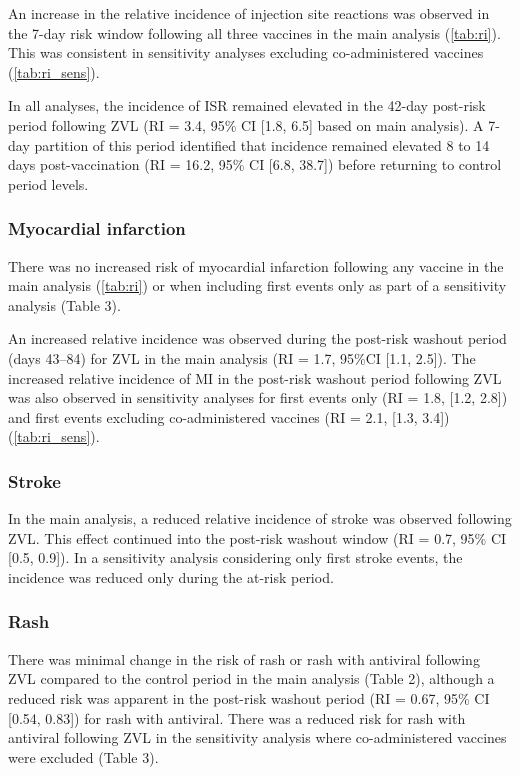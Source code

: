 \documentclass[review, endfloat]{elsarticle}
\begin{document}
An increase in the relative incidence of injection site reactions was observed in the 7-day risk window following all three vaccines in the main analysis (\autoref{tab:ri}). This was consistent in sensitivity analyses excluding co-administered vaccines (\autoref{tab:ri_sens}).

In all analyses, the incidence of ISR remained elevated in the 42-day post-risk period following ZVL (RI = 3.4, 95\% CI [1.8, 6.5] based on main analysis). A 7-day partition of this period identified that incidence remained elevated 8 to 14 days post-vaccination (RI = 16.2, 95\% CI [6.8, 38.7]) before returning to control period levels.

\subsubsection{Myocardial infarction}

There was no increased risk of myocardial infarction following any vaccine in the main analysis (\autoref{tab:ri}) or when including first events only as part of a sensitivity analysis (Table 3). 

An increased relative incidence was observed during the post-risk washout period (days 43–84) for ZVL in the main analysis (RI = 1.7, 95\%CI [1.1, 2.5]). The increased relative incidence of MI in the post-risk washout period following ZVL was also observed in sensitivity analyses for first events only (RI = 1.8, [1.2, 2.8]) and first events excluding co-administered vaccines (RI = 2.1, [1.3, 3.4]) (\autoref{tab:ri_sens}).

\subsubsection{Stroke}

In the main analysis, a reduced relative incidence of stroke was observed following ZVL. This effect continued into the post-risk washout window (RI = 0.7, 95\% CI [0.5, 0.9]). In a sensitivity analysis considering only first stroke events, the incidence was reduced only during the at-risk period.

\subsubsection{Rash}

There was minimal change in the risk of rash or rash with antiviral  following ZVL compared to the control period in the main analysis (Table 2), although a reduced risk was apparent in the post-risk washout period (RI = 0.67, 95\% CI [0.54, 0.83]) for rash with antiviral. There was a reduced risk for rash with antiviral following ZVL in the sensitivity analysis where co-administered vaccines were excluded (Table 3).
\end{document}

